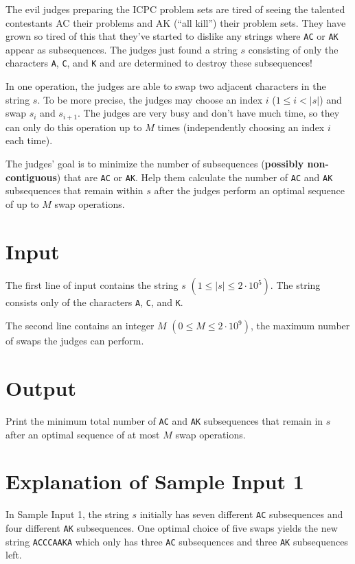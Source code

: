 \newcommand{\dmaxn}{2 \cdot 10^{5}}
\newcommand{\dmaxm}{2 \cdot 10^{9}}
The evil judges preparing the ICPC problem sets are tired of seeing the talented contestants AC their problems and AK (``all kill'') their problem sets. They have grown so tired of this that they've started to dislike any strings where \texttt{AC} or \texttt{AK} appear as subsequences. The judges just found a string $s$ consisting of only the characters \texttt{A}, \texttt{C}, and \texttt{K} and are determined to destroy these subsequences!

In one operation, the judges are able to swap two adjacent characters in the string $s$. To be more precise,
the judges may choose an index $i$ ($1 \le i < |s|$) and swap $s_i$ and $s_{i+1}$. The judges are very busy and don't have much time, so
they can only do this operation up to $M$ times (independently choosing an index $i$ each time).

The judges' goal is to minimize the number of subsequences (\textbf{possibly non-contiguous}) that are \texttt{AC} or \texttt{AK}.
Help them calculate the number of \texttt{AC} and \texttt{AK} subsequences that remain within $s$ after the judges perform an optimal sequence of up to $M$ swap operations.

\section*{Input}
The first line of input contains the string $s$ $(1 \leq |s| \leq \dmaxn)$. The string consists only of the characters \texttt{A}, \texttt{C}, and \texttt{K}.

The second line contains an integer $M$ $(0 \leq M \leq \dmaxm)$, the maximum number of swaps the judges can perform.

\section*{Output}
Print the minimum total number of \texttt{AC} and \texttt{AK} subsequences that remain in $s$ after an optimal sequence of at most $M$ swap operations.

\section*{Explanation of Sample Input 1}

In Sample Input 1, the string $s$ initially has seven different \texttt{AC} subsequences and four different \texttt{AK} subsequences. One optimal choice of five swaps yields the new string \texttt{ACCCAAKA} which only has three \texttt{AC} subsequences and three \texttt{AK} subsequences left.
